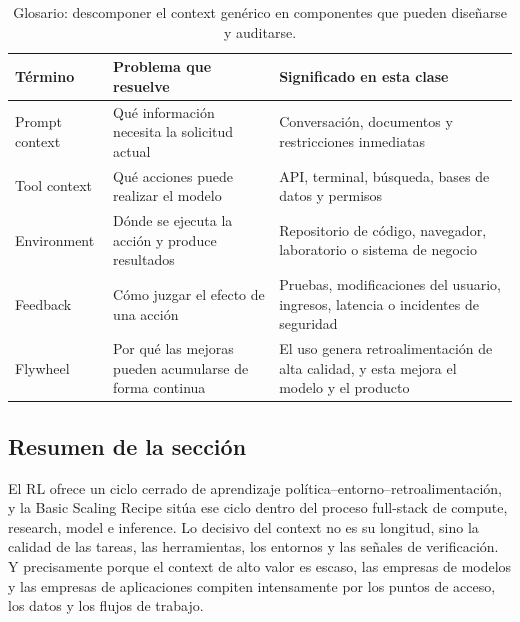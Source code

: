 \begin{table}[H]
\centering
\begin{tabular}{L{0.18\textwidth}L{0.32\textwidth}L{0.4\textwidth}}
\toprule
Término & Problema que resuelve & Significado en esta clase \\
\midrule
Prompt context & Qué información necesita la solicitud actual & Conversación, documentos y restricciones inmediatas \\
Tool context & Qué acciones puede realizar el modelo & API, terminal, búsqueda, bases de datos y permisos \\
Environment & Dónde se ejecuta la acción y produce resultados & Repositorio de código, navegador, laboratorio o sistema de negocio \\
Feedback & Cómo juzgar el efecto de una acción & Pruebas, modificaciones del usuario, ingresos, latencia o incidentes de seguridad \\
Flywheel & Por qué las mejoras pueden acumularse de forma continua & El uso genera retroalimentación de alta calidad, y esta mejora el modelo y el producto \\
\bottomrule
\end{tabular}
\caption{Glosario: descomponer el context genérico en componentes que pueden diseñarse y auditarse.}
\end{table}

\subsection{Resumen de la sección}

El RL ofrece un ciclo cerrado de aprendizaje política–entorno–retroalimentación, y la Basic Scaling Recipe sitúa ese ciclo dentro del proceso full-stack de compute, research, model e inference. Lo decisivo del context no es su longitud, sino la calidad de las tareas, las herramientas, los entornos y las señales de verificación. Y precisamente porque el context de alto valor es escaso, las empresas de modelos y las empresas de aplicaciones compiten intensamente por los puntos de acceso, los datos y los flujos de trabajo.
